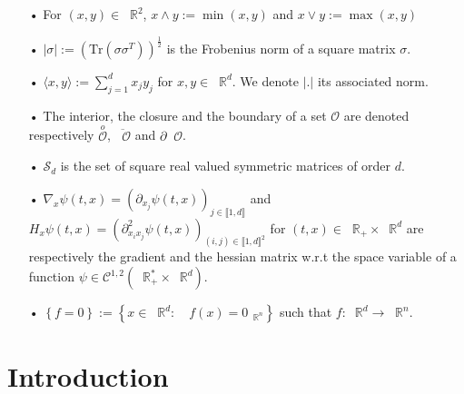 \documentclass[a4paper,12pt, openright]{report}
\numberwithin{equation}{section}
\numberwithin{equation}{section}
\newcommand*\dd{\mathop{}\!\mathrm{d}}
\newcommand*\R{\mathop{}\!\mathbb{R}}
\newcommand*\OO{\mathop{}\!\mathcal{O}}
\newcommand{\1}{\mathbbm{1}}
\theoremstyle{mystyle}
\begin{document}
\begin{enumerate}
\item[•] For $(x, y) \in \R^2$, $x\wedge y := \min\left(x, y\right)$ and $x\vee y := \max\left(x, y\right)$\\

\item[•] $| \sigma | := \left( \mathrm{Tr}\left(\sigma \sigma^T\right)\right)^{\frac{1}{2}}$ is the Frobenius norm of a square matrix $\sigma$.\\

\item[•] $\langle x, y \rangle := \displaystyle \sum_{j = 1}^{d}x_jy_j$ for $x, y \in \R^d$. We denote $|.|$ its associated norm.\\

\item[•] The interior, the closure and the boundary of a set  $\mathcal{O}$ are denoted  respectively $\overset{o}{\mathcal{O}}$, $\overline{\OO}$ and $\displaystyle \partial\OO$.\\


\item[•] $\mathcal{S}_d$ is the set of square real valued symmetric matrices of order $d$.\\

\item[•] $\nabla_x \psi(t, x) = \left(\partial_{x_j}\psi(t,x)\right)_{j\in \llbracket 1,d\rrbracket}$ and $H_x \psi(t, x) = \left(\partial_{x_ix_j}^2 \psi(t, x) \right)_{(i, j) \in \llbracket 1,d\rrbracket^2}$ for $(t, x) \in \R_+ \times \R^d$ are respectively the gradient and the hessian matrix w.r.t the space variable of a function $\psi \in \mathcal{C}^{1,2}\left(\R_+^* \times \R^d\right)$. \\

\item[•] $\left\{f = 0\right\} := \left\{ x\in \R^d: \quad f(x) = 0_{\R^n}\right\}$ such that $f: \R^d \to \R^n$. 
\end{enumerate}
\newpage
\fi

\chapter*{Introduction}
\pagestyle{fancy}
\fancyhf{}
\cfoot{\thepage}
\end{document}
